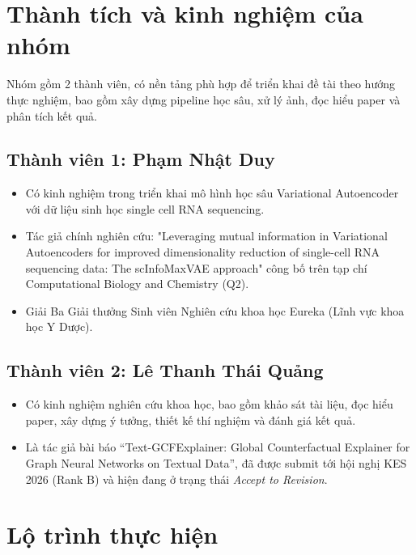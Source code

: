 \documentclass[12pt,a4paper]{article}
\begin{document}
\section{Thành tích và kinh nghiệm của nhóm}

Nhóm gồm 2 thành viên, có nền tảng phù hợp để triển khai đề tài theo hướng thực nghiệm, bao gồm xây dựng pipeline học sâu, xử lý ảnh, đọc hiểu paper và phân tích kết quả.

\subsection{Thành viên 1: Phạm Nhật Duy}

\begin{itemize}
    \item Có kinh nghiệm trong triển khai mô hình học sâu Variational Autoencoder với dữ liệu sinh học single cell RNA sequencing.
    \item Tác giả chính nghiên cứu: "Leveraging mutual information in Variational Autoencoders for improved dimensionality reduction of single-cell RNA sequencing data: The scInfoMaxVAE approach" công bố trên tạp chí Computational Biology and Chemistry (Q2).
    \item Giải Ba Giải thưởng Sinh viên Nghiên cứu khoa học Eureka (Lĩnh vực khoa học Y Dược).
\end{itemize}

\subsection{Thành viên 2: Lê Thanh Thái Quảng}

\begin{itemize}
    \item Có kinh nghiệm nghiên cứu khoa học, bao gồm khảo sát tài liệu, đọc hiểu paper, xây dựng ý tưởng, thiết kế thí nghiệm và đánh giá kết quả.
    \item Là tác giả bài báo ``Text-GCFExplainer: Global Counterfactual Explainer for Graph Neural Networks on Textual Data'', đã được submit tới hội nghị KES 2026 (Rank B) và hiện đang ở trạng thái \textit{Accept to Revision}.
\end{itemize}

\section{Lộ trình thực hiện}
\end{document}
